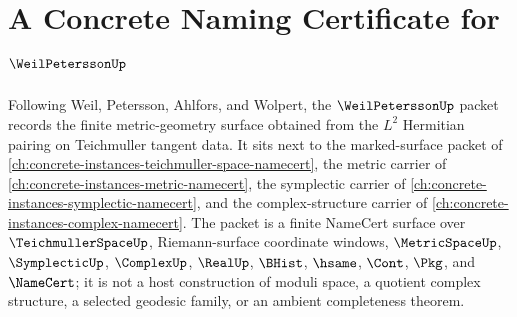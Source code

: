\chapter{A Concrete Naming Certificate for $\WeilPeterssonUp$}
\label{ch:concrete-instances-weil-petersson-namecert}

Following Weil, Petersson, Ahlfors, and Wolpert, the $\WeilPeterssonUp$ packet records the finite metric-geometry surface obtained from the $L^2$ Hermitian pairing on Teichmuller tangent data. It sits next to the marked-surface packet of \autoref{ch:concrete-instances-teichmuller-space-namecert}, the metric carrier of \autoref{ch:concrete-instances-metric-namecert}, the symplectic carrier of \autoref{ch:concrete-instances-symplectic-namecert}, and the complex-structure carrier of \autoref{ch:concrete-instances-complex-namecert}. The packet is a finite NameCert surface over $\TeichmullerSpaceUp$, Riemann-surface coordinate windows, $\MetricSpaceUp$, $\SymplecticUp$, $\ComplexUp$, $\RealUp$, $\BHist$, $\hsame$, $\Cont$, $\Pkg$, and $\NameCert$; it is not a host construction of moduli space, a quotient complex structure, a selected geodesic family, or an ambient completeness theorem.

